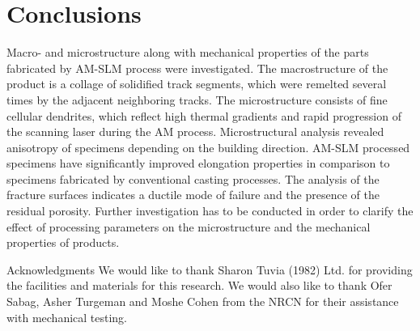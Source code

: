 \documentclass[10pt]{article}
\begin{document}
\section*{Conclusions}
Macro- and microstructure along with mechanical properties of the parts fabricated by AM-SLM process were investigated. The macrostructure of the product is a collage of solidified track segments, which were remelted several times by the adjacent neighboring tracks. The microstructure consists of fine cellular dendrites, which reflect high thermal gradients and rapid progression of the scanning laser during the AM process. Microstructural analysis revealed anisotropy of specimens depending on the building direction. AM-SLM processed specimens have significantly improved elongation properties in comparison to specimens fabricated by conventional casting processes. The analysis of the fracture surfaces indicates a ductile mode of failure and the presence of the residual porosity. Further investigation has to be conducted in order to clarify the effect of processing parameters on the microstructure and the mechanical properties of products.

Acknowledgments We would like to thank Sharon Tuvia (1982) Ltd. for providing the facilities and materials for this research. We would also like to thank Ofer Sabag, Asher Turgeman and Moshe Cohen from the NRCN for their assistance with mechanical testing.
\end{document}
